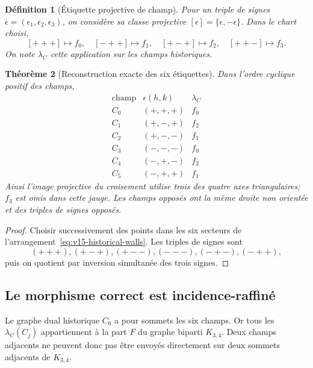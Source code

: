 \documentclass[11pt,a4paper]{article}
\newtheorem{theorem}{Théorème}[section]
\newtheorem{definition}[theorem]{Définition}
\begin{document}
\begin{definition}[Étiquette projective de champ]\label{def:v15-field-label}
Pour un triple de signes $\epsilon=(\epsilon_1,\epsilon_2,\epsilon_3)$, on considère sa classe projective $[\epsilon]=\{\epsilon,-\epsilon\}$. Dans le chart choisi,
\[
 [+++]\mapsto f_0,
 \quad[-++]\mapsto f_1,
 \quad[+-+]\mapsto f_2,
 \quad[++-]\mapsto f_3.
\]
On note $\lambda_C$ cette application sur les champs historiques.
\end{definition}

\begin{theorem}[Reconstruction exacte des six étiquettes]\label{thm:v15-six-labels}
Dans l'ordre cyclique positif des champs,
\begin{equation}\label{eq:v15-chamber-table}
\boxed{
\begin{array}{c|c|c}
\text{champ}&\epsilon(h,k)&\lambda_C\\
\hline
C_0&( +,+,+)&f_0\\
C_1&( +,-,+)&f_2\\
C_2&( +,-,-)&f_1\\
C_3&( -,-,-)&f_0\\
C_4&( -,+,-)&f_2\\
C_5&( -,+,+)&f_1
\end{array}}
\end{equation}
Ainsi l'image projective du croisement utilise trois des quatre axes triangulaires; $f_3$ est omis dans cette jauge. Les champs opposés ont la même droite non orientée et des triples de signes opposés.
\end{theorem}

\begin{proof}
Choisir successivement des points dans les six secteurs de l'arrangement~\eqref{eq:v15-historical-walls}. Les triples de signes sont
\[
 (+++),(+-+),(+--),(---),(-+-),(-++),
\]
puis on quotient par inversion simultanée des trois signes.
\end{proof}

\subsection{Le morphisme correct est incidence-raffiné}

Le graphe dual historique $C_6$ a pour sommets les six champs. Or tous les $\lambda_C(C_j)$ appartiennent à la part $F$ du graphe biparti $K_{3,4}$. Deux champs adjacents ne peuvent donc pas être envoyés directement sur deux sommets adjacents de $K_{3,4}$.
\end{document}
